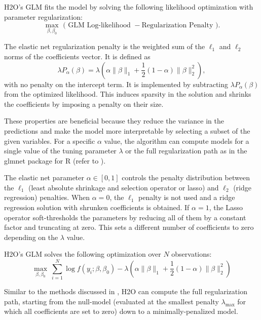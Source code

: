 H2O's GLM fits the model by solving the following likelihood optimization with parameter regularization:
 $$\max_{\beta,\beta_0} \mbox{  ( GLM Log-likelihood }  - \mbox{Regularization Penalty )} .$$

The elastic net regularization penalty is the weighted sum of the $\ell_1$ and $\ell_2$ norms of the coefficients vector. It is defined as $$\lambda P_{\alpha}(\beta) = \lambda \left(\alpha \| \beta \|_1 + \frac{1}{2} (1- \alpha) \| \beta \|_2^2 \right),$$ with no penalty on the intercept term. It is implemented by subtracting $\lambda P_{\alpha}(\beta)$ from the optimized likelihood. This induces sparsity in the solution and shrinks the coefficients by imposing a penalty on their size. 

These properties are beneficial because they reduce the variance in the predictions and make the model more interpretable by selecting a subset of the given variables. For a specific $\alpha$ value, the algorithm can compute models for a single value of the tuning parameter $\lambda$ or the full regularization path as in the glmnet package for R (refer to ).

The elastic net parameter $\alpha \in [0,1]$ controls the penalty distribution between the $\ell_1$ (least absolute shrinkage and selection operator or lasso) and $\ell_2$ (ridge regression)
penalties. When $\alpha=0$, the $\ell_1$ penalty is not used and a
ridge regression solution with shrunken coefficients is obtained. If $\alpha=1$, the Lasso operator soft-thresholds the parameters by reducing all of them by a constant factor and truncating at zero. This sets a different number of coefficients to zero depending on the $\lambda$ value.
 
H2O's GLM  solves the following optimization over $N$ observations:
$$ \max_{\beta,\beta_0}  \  \sum_{i=1}^N \log f\left(y_i ; \beta,\beta_0\right)  - \lambda \left(\alpha \| \beta \|_1 +  \frac{1}{2} (1- \alpha)\| \beta \|_2^2 \right) $$




Similar to the methods discussed in , H2O can compute the full regularization path, starting
from the null-model (evaluated at the smallest penalty $\lambda_{\max}$ for which all coefficients are set to zero) down to a minimally-penalized model. 

